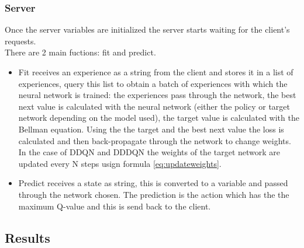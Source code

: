 \documentclass[14pt]{extarticle}
\def\sp{\vspace{5pt}}
\begin{document}
\begin{flushleft}
\subsubsection{Server}
Once the server variables are initialized the server starts waiting for the client's requests. \\
There are 2 main fuctions: fit and predict.
\begin{itemize}
\item Fit receives an experience as a string from the client and stores it in a list of experiences, query this list to obtain a batch of experiences with which the neural network is trained: the experiences pass through the network, the best next value is calculated with the neural network (either the policy or target network depending on the model used), the target value is calculated with the Bellman equation. Using the the target and the best next value the loss is calculated and then back-propagate through the network to change weights. \\
In the case of DDQN and DDDQN the weights of the target network are updated every N steps usign formula \ref{eq:updateweights}.
\item Predict receives a state as string, this is converted to a variable and passed through the network chosen. The prediction is the action which has the the maximum Q-value and this is send back to the client.
\end{itemize}

\end{flushleft}

\newpage
\begin{center}
	\section{Results}
	\sp
\end{center}
\end{document}
